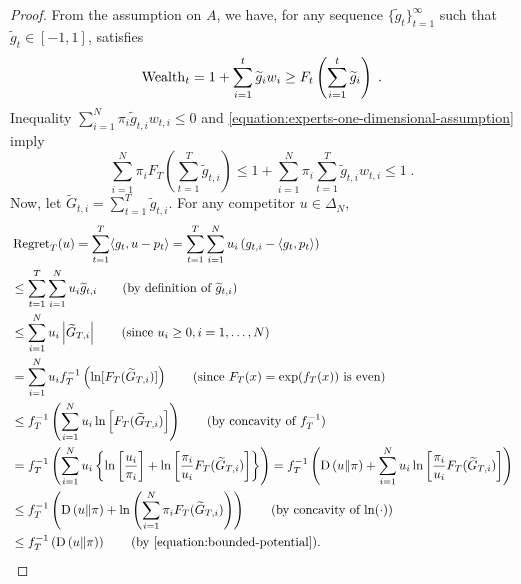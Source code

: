 \begin{proof}
From the assumption on $A$, we have, for any sequence
$\{\widetilde g_t\}_{t=1}^\infty$ such that $\widetilde g_t \in [-1,1]$, satisfies
\begin{equation}
\label{equation:experts-one-dimensional-assumption}
\operatorname{Wealth}_t = 1 + \sum_{i=1}^t \widetilde g_i w_i \ge F_t\left(\sum_{i=1}^t \widetilde g_i\right) \; .
\end{equation}
Inequality $\sum_{i=1}^N \pi_i \widetilde g_{t,i} w_{t,i} \le 0$ and \eqref{equation:experts-one-dimensional-assumption} imply
\begin{equation}
\label{equation:bounded-potential}
\sum_{i=1}^N  \pi_i F_T \left(\sum_{t=1}^T \widetilde g_{t,i} \right)
\le 1 + \sum_{i=1}^N \pi_i \sum_{t=1}^T  \widetilde g_{t,i} w_{t,i} \le 1 \; .
\end{equation}
Now, let $\widetilde G_{t,i} =
\sum_{t=1}^T \widetilde g_{t,i}$. For any competitor $u \in \Delta_N$,
\begingroup
\allowdisplaybreaks
\begin{align*}
\allowdisplaybreaks
&\Regret_T(u)
= \sum_{t=1}^T \langle g_t, u - p_t \rangle
= \sum_{t=1}^T \sum_{i=1}^N u_i \left(g_{t,i} - \langle g_t, p_t \rangle \right) \\
& \le \sum_{t=1}^T \sum_{i=1}^N u_i \widetilde g_{t,i} \qquad \text{(by definition of $\widetilde g_{t,i}$)} \\
& \le \sum_{i=1}^N u_i \left|\widetilde G_{T,i}\right| \qquad \text{(since $u_i \ge 0, i=1,\ldots, N$)}  \\
& = \sum_{i=1}^N u_i f_T^{-1}\left(\ln [F_T(\widetilde G_{T,i})] \right)  \qquad \text{(since $F_T(x) = \exp(f_T(x))$ is even)} \\
& \le f_T^{-1}\left(\sum_{i=1}^N u_i \ln \left[ F_T(\widetilde G_{T,i}) \right]\right) \qquad \text{(by concavity of $f_T^{-1}$)} \\
& = f_T^{-1}\left(\sum_{i=1}^N u_i \left\{\ln \left[\frac{u_i}{\pi_i}\right] +\ln \left[ \frac{\pi_i}{u_i} F_T(\widetilde G_{T,i}) \right] \right\} \right)
= f_T^{-1}\left(\KL{u}{\pi}+\sum_{i=1}^N u_i\ln \left[\frac{\pi_i}{u_i} F_T(\widetilde G_{T,i}) \right]\right) \\
& \le f_T^{-1}\left(\KL{u}{\pi}+\ln \left(\sum_{i=1}^N \pi_i F_T(\widetilde G_{T,i}) \right)\right) \qquad \text{(by concavity of $\ln(\cdot)$)} \\
& \le f_T^{-1}\left(\KL{u}{\pi}\right) \qquad \text{(by \eqref{equation:bounded-potential})}. \qedhere
\end{align*}
\endgroup
\end{proof}
